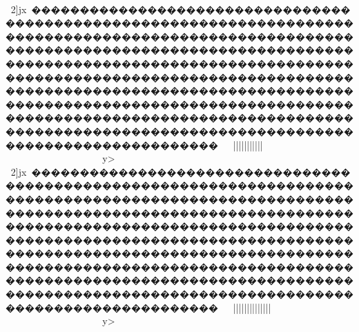 {{{{{{{{{{{{{{{{{{{{{{{{{{{{{{{{{{{{{{{{{{{{{{{{{{{{{{{{{{{{{{{{{{{{{{{{{{{{{{{{{{{{{{{{{{{{{{{{{{{{{{{{{{{{{{{{{{{{{{{{{{{{{{{{{{{{{{{{{{{{{{{{{{{{{{{{{{{{{{{{{{{{{{{{{{{{{{{{{{{{{{{{{{{{{{{{{{{{{{{{{{{{{{{{{{{{{{{{{{{{{{{{{{{{{{{{{{{{{{{{{{{{{{{{{{{{{{{{{{{{{{{{{{{{{{{{{{{{{{{{{{{{{{{{{{{{{{{{{{{{{{{{{{{{{{{{{{{{{{{{{{{{{{{{{{{{{{{{{{{{{{{{{{{{{{{{{{{{{{{{{{{{{{{{{{{{{{{{{{{{{{{{{{{{{{{{{{{{{{{{{{{{{{{{{{{{{{{{{{{{{{{{{{{{{{{{{{{{{{{{{{{{{{{{{{{{{{{{{{{{{{{{{{{{{{{{{{{{{{{{{{{{{{{{{{{{{{{{{{{{{{{{{{{{{{{{{{{{{{{{{{{{{{{{{{{{{{{{{{{{{{{{{{{{{{{{{{{{{{{{{{{{{{{{{{{{{{{{{{{{{{{{{{{{{{{{{{{{{{{{{{{{{{{{{{{{{{{{{{{{{{{{{{{{{{{{{{{{{{{{{{{{{{{{{{{{{{{{{{{{{{{{{{{{{{{{{{{{{{{{{{{{{{{{{{{{{{{{{{{{{{{{{{{{{{{{{{{{{{{{{{{{{{{{{{{{{{{{{{{{{{{{{{{{{{{{{{{{{{{{{{{{{{{{{{{{{{{{{{{{{{{{{{{{{{{{{{{{{{{{{{{{{{{{{{{{{{{{{{{{{{{{{{{{{{{{{{{{{{{{{{{{{{{{{{{{{{{{{{{{{{{{{{{{{{{{{{{{{{{{{{{{{{{{{{{{{{{{{{{{{{{{{{{{{{{{{{{{{{{{{{{{{{{{{{{{{{{{{{{{{{{{{{{{{{{{{{{{{{{{{{{{{{{{{{{{{{{{{				2]jx~�������������������������������������������������������������������������������������������������������������������������������������������������������������������������������������������������������������������������������������������������������������������������������������������������������������������������������������������������������������������������������������������~~||||||{{{{{{{{{{{{{{{{{{{{{{{{{{{{{{|||}}}}}}}}}}}||}}}~~~~~~~~~~~~~~~y>
				2]jx~�������������������������������������������������������������������������������������������������������������������������������������������������������������������������������������������������������������������������������������������������������������������������������������������������������������������������������������������������������������������������������������������~~||||||{{{{{{{{{{{{{{{{{{{{{{{{{{|||{|||}}}}}}}}}}}||}}}~~~~~~~~~~~~~~~y>
}}}}}}}}}}}}}}}}}}}}}}}}}}}}}}}}}}}}}}}}}}}}}}}}}}}}}}}}}}}}}}}}}}}}}}}}}}}}}}}}}}}}}}}}}}}}}}}}}}}}}}}}}}}}}}}}}}}}}}}}}}}}}}}}}}}}}}}}}}}}}}}}}}}}}}}}}}}}}}}}}}}}}}}}}}}}}}}}}}}}}}}}}}}}}}}}}}}}}}}}}}}}}}}}}}}}}}}}}}}}}}}}}}}}}}}}}}}}}}}}}}}}}}}}}}}}}}}}}}}}}}}}}}}}}}}}}}}}}}}}}}}}}}}}}}}}}}}}}}}}}}}}}}}}}}}}}}}}}}}}}}}}}}}}}}}}}}}}}}}}}}}}}}}}}}}}}}}}}}}}}}}}}}}}}}}}}}}}}}}}}}}}}}}}}}}}}}}}}}}}}}}}}}}}}}}}}}}}}}}}}}}}}}}}}}}}}}}}}}}}}}}}}}}}}}}}}}}}}}}}}}}}}}}}}}}}}}}}}}}}}}}}}}}}}}}}}}}}}}}}}}}}}}}}}}}}}}}}}}}}}}}}}}}}}}}}}}}}}}}}}}}}}}}}}}}}}}}}}}}}}}}}}}}}}}}}}}}}}}}}}}}}}}}}}}}}}}}}}}}}}}}}}}}}}}}}}}}}}}}}}}}}}}}}}}}}}}}}}}}}}}}}}}}}}}}}}}}}}}}}}}}}}}}}}}}}}}}}}}}}}}}}}}}}}}}}}}}}}}}}}}}}}}}}}}}}}}}}}}}}}}}}}}}}}}}}}}}}}}}}}}}}}}}}}}}}}}}}}}}}}}}}}}}}}}}}}}}}}}}}}}}}}}}}}}}}}}}}}}}}}}}}}}}}}}}}}}}}}}}}}}}}}}}}}}}}}}}}}}}}}}}}}}}}}}}}}}}}}}}}}}}}}}}}}}}}}}}}}}}}}}}}}}}}}}}}}}}}}}}}}}}}}}}}}}}}}}}}}}}}}}}}}}}}}}}}}}}}}}}}}}}}}}}}}}}}}}}}}}}}}}}}}}}}}}}}}}}}}}}}}}}}}}}}}}}}}}}}}}}}}}}}}}
